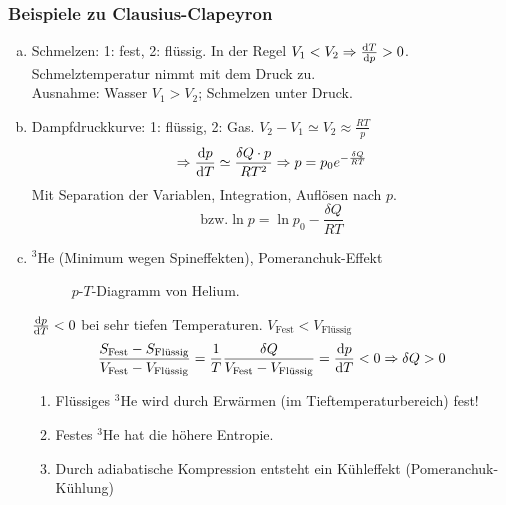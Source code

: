 \subsubsection{Beispiele zu Clausius-Clapeyron}
\begin{enumerate}[a)]
    \item Schmelzen: 1: fest, 2: flüssig. In der Regel $V_1 < V_2 \Rightarrow \frac{\mathrm{d} T}{\mathrm{d} p} > 0$. Schmelztemperatur nimmt mit dem Druck
    zu. \\
    Ausnahme: Wasser $V_1 > V_2$; Schmelzen unter Druck.
    \item Dampfdruckkurve: 1: flüssig, 2: Gas. $V_2 - V_1 \simeq V_2 \approx \frac{R T}{p}$
    \begin{equation}
        \Rightarrow \frac{\mathrm{d} p}{\mathrm{d} T} \simeq \frac{\delta Q \cdot p}{R T^2} \Rightarrow p = p_0 e^{- \frac{\delta Q}{R T}}
    \end{equation}
    Mit Separation der Variablen, Integration, Auflösen nach $p$.
    \begin{equation}
        \text{bzw.} \ln p = \ln p_0 - \frac{\delta Q}{R T}
    \end{equation}
    \item ${}^3\text{He}$ (Minimum wegen Spineffekten), Pomeranchuk-Effekt \\

\begin{figure}[H]
    \centering
    \def\svgwidth{0.5\textwidth}
    
    \caption{$p$-$T$-Diagramm von Helium.}
    \label{img:HeliumpT}
\end{figure}

    $\frac{\mathrm{d} p}{\mathrm{d} T} < 0$ bei sehr tiefen Temperaturen. $V_\text{Fest} < V_\text{Flüssig}$
    \begin{equation}
        \frac{S_\text{Fest} - S_\text{Flüssig}}{V_\text{Fest} - V_\text{Flüssig}} = \frac{1}{T} \frac{\delta Q}{V_\text{Fest} - V_\text{Flüssig}} =
        \frac{\mathrm{d} p}{\mathrm{d} T} < 0 \Rightarrow \delta Q > 0
    \end{equation}
    \begin{enumerate}[1.]
        \item Flüssiges ${}^3\text{He}$ wird durch Erwärmen (im Tieftemperaturbereich) fest!
        \item Festes ${}^3\text{He}$ hat die höhere Entropie.
        \item Durch adiabatische Kompression entsteht ein Kühleffekt (Pomeranchuk-Kühlung)
    \end{enumerate}
\end{enumerate}

